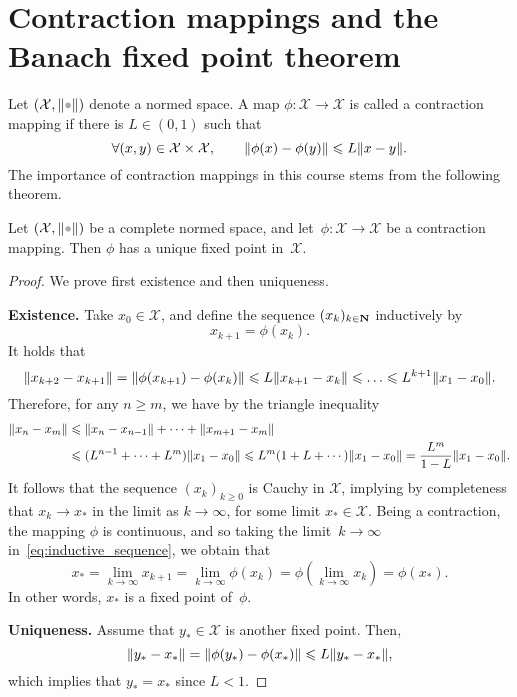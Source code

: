 \section{Contraction mappings and the Banach fixed point theorem}
Let $(\mathcal X, \norm{\placeholder})$ denote a normed space.
A map $\phi\colon \mathcal X \to \mathcal X$ is called a contraction mapping if
there is $L \in (0, 1)$ such that
\[
    \forall (x, y) \in \mathcal X \times \mathcal X, \qquad
    \lVert\phi(x) - \phi(y)\rVert \leqslant L \lVert x - y\rVert.
\]
The importance of contraction mappings in this course stems from the following theorem.
\begin{theorem}
    \label{theorem:banach_fixed_point}
    Let $(\mathcal X, \norm{\placeholder})$ be a complete normed space,
    and let~$\phi\colon \mathcal X \to \mathcal X$ be a contraction mapping.
    Then $\phi$ has a unique fixed point in~$\mathcal X$.
\end{theorem}
\begin{proof}
    We prove first existence and then uniqueness.

    \noindent\textbf{Existence.}
    Take $x_0 \in \mathcal X$,
    and define the sequence $(x_k)_{k\in \mathbf N}$ inductively by
    \begin{equation}
        \label{eq:inductive_sequence}
        x_{k+1} = \phi(x_k).
    \end{equation}
    It holds that
    \[
        \norm[big]{x_{k+2} - x_{k+1}}
        = \norm[big]{\phi(x_{k+1}) - \phi(x_k)}
        \leq L\norm{x_{k+1} - x_k}
        \leq \dots \leq L^{k+1} \norm{x_{1} - x_0}.
    \]
    Therefore, for any $n \geq m$,
    we have by the triangle inequality
    \begin{align*}
        \lVert x_{n} - x_{m}\rVert
        &\leqslant \lVert x_{n} - x_{n-1}\rVert + \dotsb + \lVert x_{m+1} - x_{m}\rVert \\
        &\leqslant (L^{n-1} + \dotsb + L^{m}) \lVert x_{1} - x_0\rVert
        \leqslant L^{m} (1 + L + \dotsb) \lVert x_{1} - x_0\rVert
        = \frac{L^{m}}{1-L} \lVert x_{1} - x_0\rVert.
    \end{align*}
    It follows that the sequence $(x_k)_{k\geq0}$ is Cauchy in $\mathcal X$,
    implying by completeness that $x_k \to x_*$ in the limit as $k \to \infty$,
    for some limit $x_* \in \mathcal X$.
    Being a contraction, the mapping $\phi$ is continuous,
    and so taking the limit~$k \to \infty$ in~\eqref{eq:inductive_sequence}, we obtain that
    \[
        x_* = \lim_{k \to \infty} x_{k+1}
        = \lim_{k \to \infty} \phi(x_k)
        = \phi \left( \lim_{k \to \infty} x_k \right)
        = \phi(x_*).
    \]
    In other words, $x_*$ is a fixed point of~$\phi$.

    \vspace{.2cm}
    \noindent\textbf{Uniqueness.}
    Assume that $y_* \in \mathcal X$ is another fixed point.
    Then,
    \begin{equation*}
        \norm[big]{y_* - x_{*}}
        = \norm[big]{\phi(y_*) - \phi(x_{*})}
        \leq L \norm{y_* - x_*},
    \end{equation*}
    which implies that $y_* = x_*$ since $L < 1$.
\end{proof}
